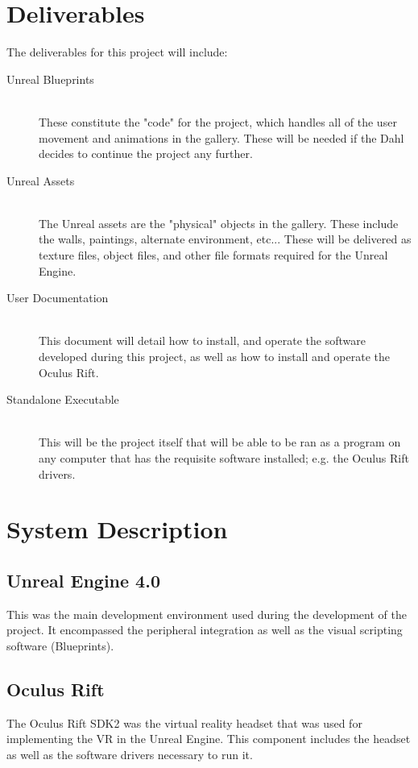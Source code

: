 \section{Deliverables}

The deliverables for this project will include:
\begin{description}
\item[Unreal Blueprints] \hfill \\
	These constitute the "code" for the project, which handles all of the user movement and animations in the gallery.  These will be needed if the Dahl decides to continue the project any further.

\item[Unreal Assets] \hfill \\
	The Unreal assets are the "physical" objects in the gallery.  These include the walls, paintings, alternate environment, etc...  These will be delivered as texture files, object files, and other file formats required for the Unreal Engine.
	
\item[User Documentation] \hfill \\
	This document will detail how to install, and operate the software developed during this project, as well as how to install and operate the Oculus Rift.

\item[Standalone Executable] \hfill \\
	This will be the project itself that will be able to be ran as a program on any computer that has the requisite software installed; e.g. the Oculus Rift drivers.
\end{description}   

\section{System Description}

\subsection{Unreal Engine 4.0}
This was the main development environment used during the development of the project.  It encompassed the peripheral integration as well as the visual scripting software (Blueprints).

\subsection{Oculus Rift}
The Oculus Rift SDK2 was the virtual reality headset that was used for implementing the VR in the Unreal Engine.  This component includes the headset as well as the software drivers necessary to run it.

